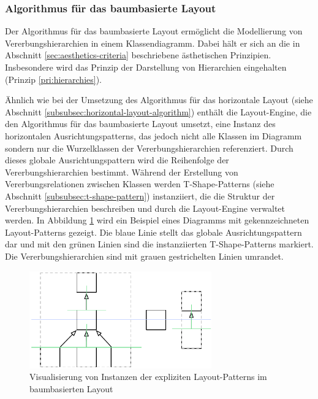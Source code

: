 \subsubsection{Algorithmus für das baumbasierte Layout}
\label{subsubsec:tree-layout-algorithm}

Der Algorithmus für das baumbasierte Layout ermöglicht die Modellierung von Vererbungshierarchien in einem Klassendiagramm. Dabei hält er sich an die in Abschnitt \ref{sec:aesthetics-criteria} beschriebene ästhetischen Prinzipien. Insbesondere wird das Prinzip der Darstellung von Hierarchien eingehalten (Prinzip \ref{pri:hierarchies}).

Ähnlich wie bei der Umsetzung des Algorithmus für das horizontale Layout (siehe Abschnitt \ref{subsubsec:horizontal-layout-algorithm}) enthält die Layout-Engine, die den Algorithmus für das baumbasierte Layout umsetzt, eine Instanz des horizontalen Ausrichtungspatterns, das jedoch nicht alle Klassen im Diagramm sondern nur die Wurzelklassen der Vererbungshierarchien referenziert. Durch dieses globale Ausrichtungspattern wird die Reihenfolge der Vererbungshierarchien bestimmt. Während der Erstellung von Vererbungsrelationen zwischen Klassen werden T-Shape-Patterns (siehe Abschnitt \ref{subsubsec:t-shape-pattern}) instanziiert, die die Struktur der Vererbungshierarchien beschreiben und durch die Layout-Engine verwaltet werden. In Abbildung \ref{fig:tree-based-layout} wird ein Beispiel eines Diagramms mit gekennzeichneten Layout-Patterns gezeigt. Die blaue Linie stellt das globale Ausrichtungspattern dar und mit den grünen Linien sind die instanziierten T-Shape-Patterns markiert. Die Vererbungshierarchien sind mit grauen gestrichelten Linien umrandet.

\begin{figure}[hbt]
    \centering
    \includegraphics[width=0.7\textwidth]{resources/tree-based-layout}
    \caption{Visualisierung von Instanzen der expliziten Layout-Patterns im baumbasierten Layout}
    \label{fig:tree-based-layout}
\end{figure}

